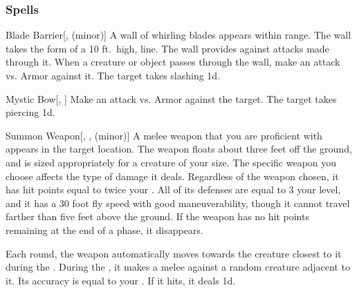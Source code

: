 \subsubsection{Spells}


\lowercase{\hypertarget{spell:Blade Barrier}{}}\label{spell:Blade Barrier}
\begin{freeability}[\nth{1}]{\hypertarget{spell:Blade Barrier}{Blade Barrier}}[,  (minor)]
A wall of whirling blades appears within \rngmed range.
The wall takes the form of a 10 ft.\ high, \arealarge line.
The wall provides  against attacks made through it.
When a creature or object passes through the wall, make an attack vs. Armor against it.
\hit The target takes slashing  \minus1d.
\end{freeability}
\vspace{0.25em}



\lowercase{\hypertarget{spell:Mystic Bow}{}}\label{spell:Mystic Bow}
\begin{freeability}[\nth{1}]{\hypertarget{spell:Mystic Bow}{Mystic Bow}}[, ]
Make an attack vs. Armor against the target.
\hit The target takes piercing  \plus1d.
\end{freeability}
\vspace{0.25em}



\lowercase{\hypertarget{spell:Summon Weapon}{}}\label{spell:Summon Weapon}
\begin{freeability}[\nth{1}]{\hypertarget{spell:Summon Weapon}{Summon Weapon}}[, ,  (minor)]
A melee weapon that you are proficient with appears in the target location.
The weapon floats about three feet off the ground, and is sized appropriately for a creature of your size.
The specific weapon you choose affects the type of damage it deals.
Regardless of the weapon chosen, it has hit points equal to twice your .
All of its defenses are equal to 3 \add your level, and it has a 30 foot fly speed with good maneuverability, though it cannot travel farther than five feet above the ground.
If the weapon has no hit points remaining at the end of a phase, it disappears.

Each round, the weapon automatically moves towards the creature closest to it during the .
During the , it makes a melee  against a random creature adjacent to it.
Its accuracy is equal to your .
If it hits, it deals  \minus1d.
\end{freeability}
\vspace{0.25em}



